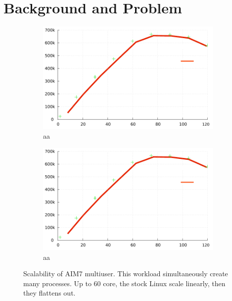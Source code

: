 \section{Background and Problem}


\ifkor
\begin{figure}
  \begin{subfigure}[b]{0.23\textwidth}
    \includegraphics[width=\textwidth]{graph/aim7_default}
    \caption{aa}
  \end{subfigure}%
  \begin{subfigure}[b]{0.25\textwidth}
    \includegraphics[width=\textwidth]{graph/aim7_default}
    \caption{aa}
  \end{subfigure}
  \centering
  \caption{Scalability of AIM7 multiuser. This workload simultaneously create
  many processes.
  Up to 60 core, the stock Linux scale linearly, then they flattens out.}
  \label{fig:aim7_default}
\end{figure}

